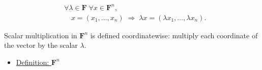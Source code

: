 \begin{remark*}
\[
\begin{aligned}
&\forall \lambda \in \mathbf{F}\;\forall x \in \mathbf{F}^n, \\
&\quad
x=(x_1,\dots,x_n)
\;\Rightarrow\;
\lambda x=(\lambda x_1,\dots,\lambda x_n).
\end{aligned}
\]
\end{remark*}

\begin{remark*}[Interpretation]
Scalar multiplication in $\mathbf{F}^n$ is defined coordinatewise: multiply
each coordinate of the vector by the scalar \(\lambda\).
\end{remark*}

\begin{dependencies}
\begin{itemize}
  \item \hyperref[def:fn]{Definition: $\mathbf{F}^n$}
\end{itemize}
\end{dependencies}
